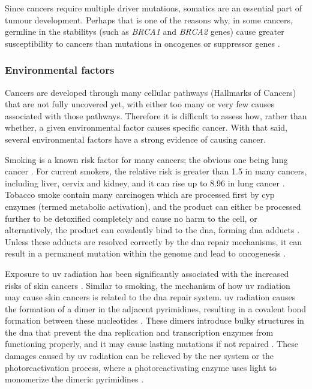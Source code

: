 Since cancers require multiple \gls{driver} mutations, \glspl{somatic} are an essential part of tumour development.
Perhaps that is one of the reasons why, in some cancers, \gls{germline} in the \glspl{stability} (such as \textit{BRCA1} and \textit{BRCA2} genes) cause greater susceptibility to cancers than mutations in \glspl{oncogene} or \gls{suppressor} genes \citep{Vogelstein2004a}.

\subsubsection{Environmental factors}
\label{ssub:environmental_factors}

Cancers are developed through many cellular pathways (Hallmarks of Cancers) that are not fully uncovered yet, with either too many or very few causes associated with those pathways.
Therefore it is difficult to assess how, rather than whether, a given environmental factor causes specific cancer.
With that said, several environmental factors have a strong evidence of causing cancer.

Smoking is a known risk factor for many cancers; the obvious one being lung cancer \citep{Gandini2008,Hecht1999}.
For current smokers, the relative risk is greater than 1.5 in many cancers, including liver, cervix and kidney, and it can rise up to 8.96 in lung cancer \citep{Gandini2008}.
Tobacco smoke contain many \gls{carcinogen} which are processed first by \gls{cyp} enzymes (termed meta\-bolic activation), and the product can either be processed further to be detoxified completely and cause no harm to the cell, or alternatively, the product can covalently bind to the \acrshort{dna}, forming \acrshort{dna} adducts \citep{Hecht1999}.
Unless these adducts are resolved correctly by the \acrshort{dna} repair mechanisms, it can result in a permanent mutation within the genome and lead to oncogenesis \citep{Hecht1999}.

Exposure to \gls{uv} radiation has been significantly associated with the increased risks of skin cancers \citep{Armstrong2001,Gallagher2006}.
Similar to smoking, the mechanism of how \gls{uv} radiation may cause  skin cancers is related to the \acrshort{dna} repair system.
\gls{uv} radiation causes the formation of a dimer in the adjacent pyrimidines, resulting in a covalent bond formation between these nucleotides \citep{Friedberg2003,Hoeijmakers2001}.
These dimers introduce bulky structures in the \acrshort{dna} that prevent the \acrshort{dna} replication and transcription enzymes from functioning properly, and it may cause lasting mutations if not repaired \citep{Friedberg2003,Hoeijmakers2001}.
These damages caused by \gls{uv} radiation can be relieved by the \gls{ner} system or the photoreactivation process, where a photoreactivating enzyme uses light to monomerize the dimeric pyrimidines \citep{Friedberg2003}.

